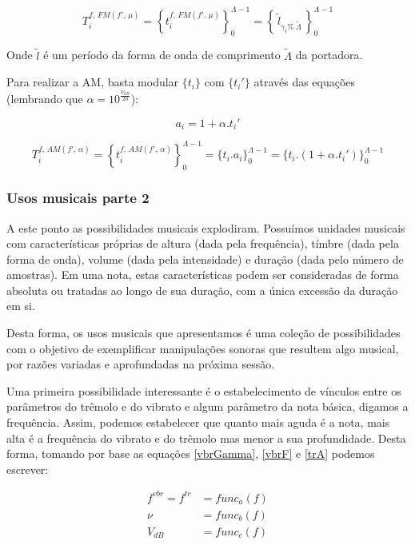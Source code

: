 \begin{equation}\label{fmT}
T_i^{f,\, FM(f',\,\mu)}=\left\{ t_i^{f,\,FM(f',\,\mu)} \right\}_0^{\Lambda-1}=\left\{\,\widetilde{l}_{\gamma_i \%\; \widetilde{\Lambda} } \,\right\}_0^{\Lambda-1}
\end{equation}

Onde $\widetilde{l}$ é um período da forma de onda de comprimento $\widetilde{\Lambda}$ da portadora.

Para realizar a AM, basta modular $\{t_i\}$ com $\{t_i'\}$ através das equações (lembrando que $\alpha=10^{\frac{V_{dB}}{20}}$):

\begin{equation}\label{amA}
a_i=1 + \alpha . t_i'
\end{equation}

\begin{equation}\label{trT}
T_i^{f,\,AM(f',\,\alpha)}=\left\{ t_i^{f,\,AM(f',\,\alpha)} \right\}_0^{\Lambda-1}=\{ t_i . a_i \}_0^{\Lambda-1}=\{t_i . (1 + \alpha . t_i')    \}_0^{\Lambda-1}
\end{equation}



\subsubsection{Usos musicais parte 2}
A este ponto as possibilidades musicais explodiram. Possuímos unidades
musicais com características próprias de altura (dada pela frequência),
tímbre (dada pela forma de onda),
volume (dada pela intensidade) e duração (dada pelo número de amostras).
Em uma nota, estas características podem ser consideradas
de forma absoluta ou tratadas ao longo de sua duração,
com a única excessão da duração em si.

Desta forma, os usos musicais que apresentamos é uma coleção de possibilidades
com o objetivo de exemplificar manipulações sonoras que resultem algo
musical, por razões variadas e aprofundadas na próxima sessão.

Uma primeira possibilidade interessante é o estabelecimento de vínculos
entre os parâmetros do trêmolo e do vibrato e algum parâmetro da nota básica,
digamos a frequência. Assim, podemos estabelecer que quanto mais aguda é a nota,
mais alta é a frequência do vibrato e do trêmolo mas menor a sua profundidade.
Desta forma, tomando por base as equações \ref{vbrGamma}, \ref{vbrF} e \ref{trA}
podemos escrever:

\begin{equation}
\begin{split}
f^{vbr} = f^{tr} & = func_a(f) \\
\nu & = func_b(f) \\
V_{dB} & = func_c(f)
\end{split}
\end{equation}

